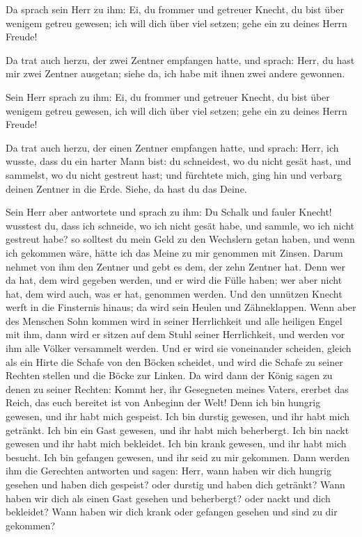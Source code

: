  Da sprach sein Herr zu ihm: Ei, du frommer und getreuer
Knecht, du bist über wenigem getreu gewesen; ich will dich über viel
setzen; gehe ein zu deines Herrn Freude!

 Da trat auch herzu, der zwei Zentner empfangen hatte,
und sprach: Herr, du hast mir zwei Zentner ausgetan; siehe da, ich habe
mit ihnen zwei andere gewonnen.

 Sein Herr sprach zu ihm: Ei, du frommer und getreuer
Knecht, du bist über wenigem getreu gewesen, ich will dich über viel
setzen; gehe ein zu deines Herrn Freude!

 Da trat auch herzu, der einen Zentner empfangen hatte,
und sprach: Herr, ich wusste, dass du ein harter Mann bist: du
schneidest, wo du nicht gesät hast, und sammelst, wo du nicht gestreut
hast;  und fürchtete mich, ging hin und verbarg deinen
Zentner in die Erde. Siehe, da hast du das Deine.

 Sein Herr aber antwortete und sprach zu ihm: Du Schalk
und fauler Knecht! wusstest du, dass ich schneide, wo ich nicht gesät
habe, und sammle, wo ich nicht gestreut habe?  so
solltest du mein Geld zu den Wechslern getan haben, und wenn ich
gekommen wäre, hätte ich das Meine zu mir genommen mit Zinsen.
 Darum nehmet von ihm den Zentner und gebt es dem, der
zehn Zentner hat.  Denn wer da hat, dem wird gegeben
werden, und er wird die Fülle haben; wer aber nicht hat, dem wird auch,
was er hat, genommen werden.  Und den unnützen Knecht
werft in die Finsternis hinaus; da wird sein Heulen und Zähneklappen.
 Wenn aber des Menschen Sohn kommen wird in seiner
Herrlichkeit und alle heiligen Engel mit ihm, dann wird er sitzen auf
dem Stuhl seiner Herrlichkeit,  und werden vor ihm alle
Völker versammelt werden. Und er wird sie voneinander scheiden, gleich
als ein Hirte die Schafe von den Böcken scheidet,  und
wird die Schafe zu seiner Rechten stellen und die Böcke zur Linken.
 Da wird dann der König sagen zu denen zu seiner Rechten:
Kommt her, ihr Gesegneten meines Vaters, ererbet das Reich, das euch
bereitet ist von Anbeginn der Welt!  Denn ich bin hungrig
gewesen, und ihr habt mich gespeist. Ich bin durstig gewesen, und ihr
habt mich getränkt. Ich bin ein Gast gewesen, und ihr habt mich
beherbergt.  Ich bin nackt gewesen und ihr habt mich
bekleidet. Ich bin krank gewesen, und ihr habt mich besucht. Ich bin
gefangen gewesen, und ihr seid zu mir gekommen.  Dann
werden ihm die Gerechten antworten und sagen: Herr, wann haben wir dich
hungrig gesehen und haben dich gespeist? oder durstig und haben dich
getränkt?  Wann haben wir dich als einen Gast gesehen und
beherbergt? oder nackt und dich bekleidet?  Wann haben
wir dich krank oder gefangen gesehen und sind zu dir gekommen?

